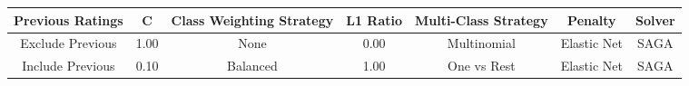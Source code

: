 \footnotesize
\begin{tabular}{ccccccc}
\toprule
Previous Ratings & C & Class Weighting Strategy & L1 Ratio & Multi-Class Strategy & Penalty & Solver \\
\midrule
Exclude Previous & 1.00 & None & 0.00 & Multinomial & Elastic Net & SAGA \\
Include Previous & 0.10 & Balanced & 1.00 & One vs Rest & Elastic Net & SAGA \\
\bottomrule
\end{tabular}

\normalsize